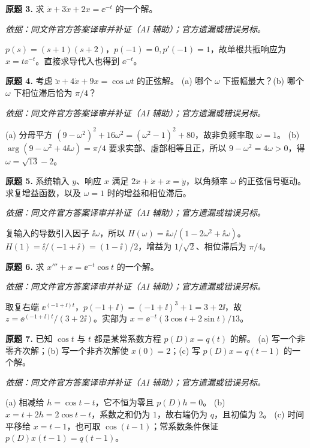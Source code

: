 \begin{exercise}\label{cw:prex2-3}\textbf{原题 3.} 求 $\ddot x+3\dot x+2x=\ee^{-t}$ 的一个解。
\end{exercise}
\begin{solution}
\textit{依据：同文件官方答案译审并补证（AI 辅助）；官方遗漏或错误另标。}\par
$p(s)=(s+1)(s+2)$，$p(-1)=0,p'(-1)=1$，故单根共振响应为 $x=t\ee^{-t}$。直接求导代入也得到 $\ee^{-t}$。
\end{solution}
\begin{exercise}\label{cw:prex2-4}\textbf{原题 4.} 考虑 $\ddot x+4\dot x+9x=\cos\omega t$ 的正弦解。
(a) 哪个 $\omega$ 下振幅最大？(b) 哪个 $\omega$ 下相位滞后恰为 $\pi/4$？
\end{exercise}
\begin{solution}
\textit{依据：同文件官方答案译审并补证（AI 辅助）；官方遗漏或错误另标。}\par
(a) 分母平方 $(9-\omega^2)^2+16\omega^2=(\omega^2-1)^2+80$，故非负频率取 $\omega=1$。
(b) $\arg(9-\omega^2+4\ii\omega)=\pi/4$ 要求实部、虚部相等且正，所以 $9-\omega^2=4\omega>0$，得 $\omega=\sqrt{13}-2$。
\end{solution}
\begin{exercise}\label{cw:prex2-5}\textbf{原题 5.} 系统输入 $y$、响应 $x$ 满足 $2\ddot x+\dot x+x=\dot y$，以角频率 $\omega$ 的正弦信号驱动。求复增益函数，以及 $\omega=1$ 时的增益和相位滞后。
\end{exercise}
\begin{solution}
\textit{依据：同文件官方答案译审并补证（AI 辅助）；官方遗漏或错误另标。}\par
复输入的导数引入因子 $\ii\omega$，所以 $H(\omega)=\ii\omega/(1-2\omega^2+\ii\omega)$。$H(1)=\ii/(-1+\ii)=(1-\ii)/2$，增益为 $1/\sqrt2$、相位滞后为 $\pi/4$。
\end{solution}
\begin{exercise}\label{cw:prex2-6}\textbf{原题 6.} 求 $x'''+x=\ee^{-t}\cos t$ 的一个解。
\end{exercise}
\begin{solution}
\textit{依据：同文件官方答案译审并补证（AI 辅助）；官方遗漏或错误另标。}\par
取复右端 $\ee^{(-1+\ii)t}$，$p(-1+\ii)=(-1+\ii)^3+1=3+2\ii$，故 $z=\ee^{(-1+\ii)t}/(3+2\ii)$。实部为 $x=\ee^{-t}(3\cos t+2\sin t)/13$。
\end{solution}
\begin{exercise}\label{cw:prex2-7}\textbf{原题 7.} 已知 $\cos t$ 与 $t$ 都是某常系数方程 $p(D)x=q(t)$ 的解。
(a) 写一个非零齐次解；(b) 写一个非齐次解使 $x(0)=2$；(c) 写 $p(D)x=q(t-1)$ 的一个解。
\end{exercise}
\begin{solution}
\textit{依据：同文件官方答案译审并补证（AI 辅助）；官方遗漏或错误另标。}\par
(a) 相减给 $h=\cos t-t$，它不恒为零且 $p(D)h=0$。
(b) $x=t+2h=2\cos t-t$，系数之和仍为 $1$，故右端仍为 $q$，且初值为 $2$。
(c) 时间平移给 $x=t-1$，也可取 $\cos(t-1)$；常系数条件保证 $p(D)x(t-1)=q(t-1)$。
\end{solution}

